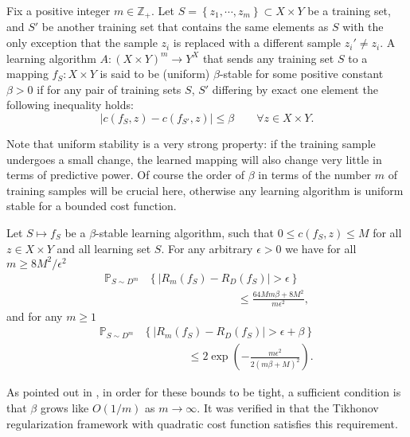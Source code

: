 \documentclass[letterpaper]{article} %
\begin{document}
\begin{definition}
  \label{defn:uniform-stability}
  Fix a positive integer $m\in\mathbb{Z}_+$. Let $S=\left\{ z_1,\cdots,z_m \right\}\subset X\times Y$ be a training set, and $S'$ be another training set that contains the same elements as $S$ with the only exception that the sample $z_i$ is replaced with a different sample $z_i'\neq z_i$. A learning algorithm $A:\left( X\times Y \right)^m\rightarrow Y^X$ that sends any training set $S$ to a mapping $f_S:X\times Y$ is said to be (uniform) $\beta$-stable for some positive constant $\beta>0$ if for any pair of training sets $S$, $S'$ differing by exact one element the following inequality holds:
  \begin{equation*}
    \left| c \left( f_S,z \right)-c\left(f_{S'},z\right) \right|\leq \beta\qquad\forall z\in X\times Y.
  \end{equation*}
\end{definition}
Note that uniform stability is a very strong property: if the training sample undergoes a small change, the learned mapping will also change very little in terms of predictive power. Of course the order of $\beta$ in terms of the number $m$ of training samples will be crucial here, otherwise any learning algorithm is uniform stable for a bounded cost function.

\begin{theorem}
  \label{thm:bousquet-elisseeff}
  Let $S\mapsto f_S$ be a $\beta$-stable learning algorithm, such that $0\leq c \left( f_S,z \right)\leq M$ for all $z\in X\times Y$ and all learning set $S$. For any arbitrary $\epsilon>0$ we have for all $m\geq 8M^2/\epsilon^2$
  \begin{equation}
    \label{eq:fraction-bounds}
    \begin{aligned}
    \mathbb{P}_{S\sim D^m} &\left\{ \left| R_m \left( f_S \right)-R_D \left( f_S \right) \right| > \epsilon\right\}\\
    &\qquad\qquad\qquad\qquad\leq \frac{64 Mm\beta+8M^2}{m\epsilon^2},
    \end{aligned}
  \end{equation}
  and for any $m\geq 1$
  \begin{equation}
    \label{eq:exponential-bounds}
    \begin{aligned}
    \mathbb{P}_{S\sim D^m}&\left\{ \left| R_m \left( f_S \right)-R_D \left( f_S \right) \right| > \epsilon+\beta\right\}\\
    &\qquad\qquad\leq 2\exp \left( -\frac{m\epsilon^2}{2 \left( m\beta+M \right)^2} \right).
    \end{aligned}
  \end{equation}
\end{theorem}
As pointed out in \cite{Algorithmic_Stability}, in order for these bounds to be tight, a sufficient condition is that $\beta$ grows like $O \left( 1/m \right)$ as $m\rightarrow\infty$. It was verified in \cite{Algorithmic_Stability} that the Tikhonov regularization framework with quadratic cost function satisfies this requirement.
\end{document}
